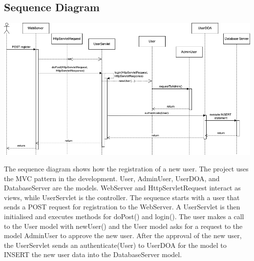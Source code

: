 \subsection{Sequence Diagram}

\includegraphics[]{images/sequenceDiagram.png}


The sequence diagram shows how the registration of a new user.
The project uses the MVC pattern in the development.
User, AdminUser, UserDOA, and DatabaseServer are the models.
WebServer and HttpServletRequest interact as views, while UserServlet is the controller.
The sequence starts with a user that sends a POST request for registration to the WebServer.
A UserServlet is then initialised and executes methods for doPost() and login().
The user makes a call to the User model with newUser() and the User model asks for a request to the model AdminUser to approve the new user.
After the approval of the new user, the UserServlet sends an authenticate(User) to UserDOA for the model to INSERT the new user data into the DatabaseServer model.